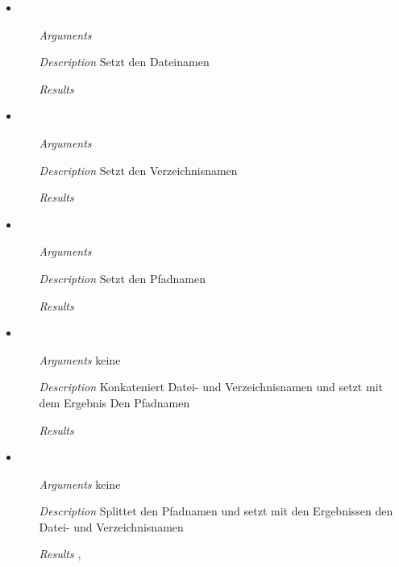 \begin{itemize}

\item {}
\begin{enumerate}
\item[\textit{Arguments}] 
\item[\textit{Description}] Setzt den Dateinamen
\item[\textit{Results}] 
\end{enumerate}

\item {}
\begin{enumerate}
\item[\textit{Arguments}] 
\item[\textit{Description}] Setzt den Verzeichnisnamen
\item[\textit{Results}] 
\end{enumerate}

\item {}
\begin{enumerate}
\item[\textit{Arguments}] 
\item[\textit{Description}] Setzt den Pfadnamen
\item[\textit{Results}] 
\end{enumerate}

\item {}
\begin{enumerate}
\item[\textit{Arguments}] keine
\item[\textit{Description}] Konkateniert Datei-
und Verzeichnisnamen und setzt mit dem Ergebnis
Den Pfadnamen
\item[\textit{Results}] 
\end{enumerate}

\item {}
\begin{enumerate}
\item[\textit{Arguments}] keine 
\item[\textit{Description}] Splittet den Pfadnamen und 
setzt mit den Ergebnissen den Datei- und Verzeichnisnamen
\item[\textit{Results}] , 
\end{enumerate}


\end{itemize}
